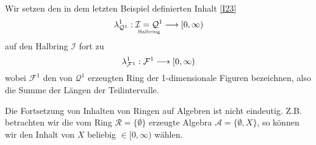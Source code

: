 \begin{example}
Wir setzen den in dem letzten Beispiel definierten Inhalt \eqref{I23}
\begin{equation*}
\lambda^1_{\mathcal{Q}^1}: \underset{\text{\tiny{Halbring}}}{\mathcal{I} = \mathcal{Q}^1} \longrightarrow [0,\infty)
\end{equation*} auf den Halbring $\mathcal{I}$ fort zu
\begin{equation*}
\lambda^1_{\mathcal{F}^1}:\mathcal{F}^1 \longrightarrow [0,\infty)
\end{equation*}
wobei $\mathcal{F}^1$ den von $\mathcal{Q}^1$ erzeugten Ring der 1-dimensionale Figuren bezeichnen, also die Summe der Längen der Teilintervalle.
\end{example}
\begin{remark}
Die Fortsetzung von Inhalten von Ringen auf Algebren ist nicht eindeutig. Z.B. betrachten wir die vom Ring $\mathcal{R}=\{ \emptyset\}$ erzeugte Algebra $\mathcal{A} = \{ \emptyset, X\}$, so können wir den Inhalt von $X$ beliebig $\in [0,\infty)$ wählen.
\end{remark}
